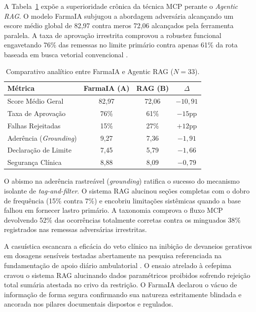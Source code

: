 \documentclass[12pt]{article}
\begin{document}
A Tabela~\ref{tab:resultados} expõe a superioridade crônica da técnica MCP perante o \textit{Agentic RAG}. O modelo FarmaIA subjugou a abordagem adversária alcançando um escore médio global de 82,97 contra meros 72,06 alcançados pela ferramenta paralela. A taxa de aprovação irrestrita comprovou a robustez funcional engavetando 76\% das remessas no limite primário contra apenas 61\% da rota baseada em busca vetorial convencional \cite{ji2023survey}.

\begin{table}[htbp]
\caption{Comparativo analítico entre FarmaIA e Agentic RAG ($N=33$).}
\label{tab:resultados}
\centering
\small
\begin{tabularx}{\textwidth}{@{}l c c c@{}}
\toprule
\textbf{Métrica} & \textbf{FarmaIA (A)} & \textbf{RAG (B)} & \textbf{$\Delta$} \\
\midrule
Score Médio Geral      & 82,97 & 72,06 & $-10,91$ \\
Taxa de Aprovação      & 76\%  & 61\%  & $-15$pp \\
Falhas Rejeitadas      & 15\%  & 27\%  & $+12$pp \\
Aderência (\textit{Grounding}) & 9,27  & 7,36  & $-1,91$ \\
Declaração de Limite   & 7,45  & 5,79  & $-1,66$ \\
Segurança Clínica      & 8,88  & 8,09  & $-0,79$ \\
\bottomrule
\end{tabularx}
\end{table}
\FloatBarrier

O abismo na aderência rastreável (\textit{grounding}) ratifica o sucesso do mecanismo isolante de \textit{tag-and-filter}. O sistema RAG alucinou seções completas com o dobro de frequência (15\% contra 7\%) e encobriu limitações sistêmicas quando a base falhou em fornecer lastro primário. A taxonomia comprova o fluxo MCP devolvendo 52\% das ocorrências totalmente corretas contra os minguados 38\% registrados nas remessas adversárias irrestritas.

A casuística escancara a eficácia do veto clínico na inibição de devaneios gerativos em dosagens sensíveis testadas abertamente na pesquisa referenciada na fundamentação de apoio diário ambulatorial \cite{zheng2023judging}. O ensaio atrelado à cefepima cravou o sistema RAG alucinando dados paramétricos proibidos sofrendo rejeição total sumária atestada no crivo da restrição. O FarmaIA declarou o vácuo de informação de forma segura confirmando sua natureza estritamente blindada e ancorada nos pilares documentais dispostos e regulados.
\end{document}
